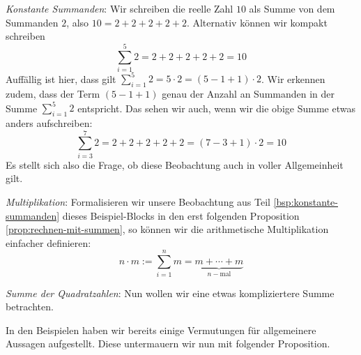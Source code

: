 \begin{example}
    \begin{thmenum}
        \item \label{bsp:konstante-summanden} \textit{Konstante Summanden}: Wir schreiben die reelle Zahl \(10\) als Summe von dem Summanden \(2\), also \(10 = 2+2+2+2+2\). Alternativ können wir kompakt schreiben 
        \begin{equation*}
            \sum_{i=1}^5 2 = 2 + 2+ 2+ 2+ 2 = 10
        \end{equation*}
        Auffällig ist hier, dass gilt \(\sum_{i=1}^5 2 = 5\cdot 2 = (5 - 1 + 1) \cdot 2 \). Wir erkennen zudem, dass der Term \((5-1+1)\) genau der Anzahl an Summanden in der Summe \(\sum_{i=1}^5 2\) entspricht. Das sehen wir auch, wenn wir die obige Summe etwas anders aufschreiben: 
        \begin{equation*}
            \sum_{i=3}^7 2 = 2 + 2 + 2 + 2 + 2 = (7-3+1)\cdot 2 = 10
        \end{equation*}
        Es stellt sich also die Frage, ob diese Beobachtung auch in voller Allgemeinheit gilt. 
        
        \item \textit{Multiplikation}: Formalisieren wir unsere Beobachtung aus Teil \ref{bsp:konstante-summanden} dieses Beispiel-Blocks in den erst folgenden Proposition \ref{prop:rechnen-mit-summen}, so können wir die arithmetische Multiplikation einfacher definieren:
        \begin{equation*}
            n\cdot m := \sum_{i=1}^n m = \underbrace{m+\cdots +m}_{n-\text{mal}}
        \end{equation*}

        \item \textit{Summe der Quadratzahlen}: Nun wollen wir eine etwas kompliziertere Summe betrachten. 
    \end{thmenum}
\end{example}
In den Beispielen haben wir bereits einige Vermutungen für allgemeinere Aussagen aufgestellt. Diese untermauern wir nun mit folgender Proposition. 


